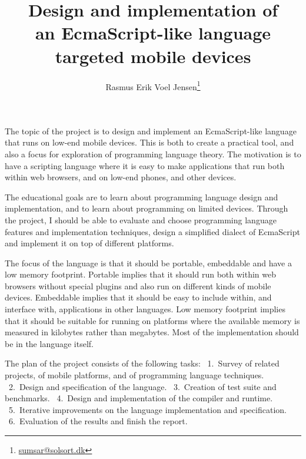 \documentclass[12pt]{article}
\title{Design and implementation of \\ an EcmaScript-like language \\ targeted mobile devices}
\author{Rasmus Erik Voel Jensen\footnote{\url{sumsar@solsort.dk}}
}
\begin{document}
\maketitle





The topic of the project is to design and implement an EcmaScript-like language  that runs on low-end mobile devices. This is both to create a practical tool, and also a focus for exploration of programming language theory.
The motivation is to have a scripting language where it is easy to make applications that run both within web browsers, and on low-end phones, and other devices.

The educational goals are 
to learn about programming language design and implementation, 
and to learn about programming on limited devices.
Through the project, I should be able to evaluate and choose programming language features and implementation techniques, design a simplified dialect of EcmaScript and implement it on top of different platforms.

The focus of the language is that it should be portable, embeddable and have a low memory footprint. 
Portable implies that it should run both within web browsers without special plugins and also run on different kinds of mobile devices.
Embeddable implies that it should be easy to include within, and interface with, applications in other languages.
Low memory footprint implies that it should be suitable for running on platforms where the available memory is measured in kilobytes rather than megabytes.
Most of the implementation should be in the language itself.

The plan of the project consists of the following tasks:
~1.~Survey of related projects, of mobile platforms, and of programming language techniques.
~\mbox{2.~Design} and specification of the language.
~3.~Creation of test suite and benchmarks.
~4.~Design and implementation of the compiler and runtime.
~\mbox{5.~Iterative} improvements on the language implementation and specification.
~6.~Evaluation of the results and finish the report.
\end{document}
